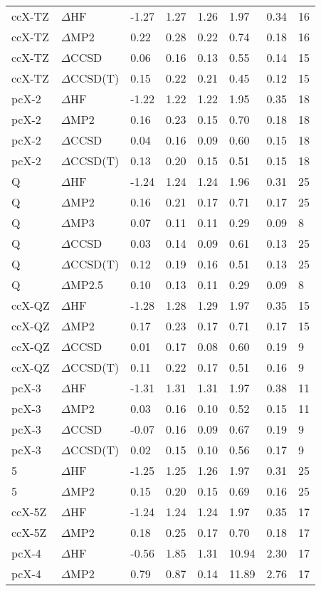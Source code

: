 \begin{table}
\begin{tabular}{l l l l l l l l }
    ccX-TZ & $\Delta$HF & -1.27 & 1.27 & 1.26 & 1.97 & 0.34 & 16 \\ 
    ccX-TZ & $\Delta$MP2 & 0.22 & 0.28 & 0.22 & 0.74 & 0.18 & 16 \\ 
    ccX-TZ & $\Delta$CCSD & 0.06 & 0.16 & 0.13 & 0.55 & 0.14 & 15 \\ 
    ccX-TZ & $\Delta$CCSD(T) & 0.15 & 0.22 & 0.21 & 0.45 & 0.12 & 15 \\ 
    pcX-2 & $\Delta$HF & -1.22 & 1.22 & 1.22 & 1.95 & 0.35 & 18 \\ 
    pcX-2 & $\Delta$MP2 & 0.16 & 0.23 & 0.15 & 0.70 & 0.18 & 18 \\ 
    pcX-2 & $\Delta$CCSD & 0.04 & 0.16 & 0.09 & 0.60 & 0.15 & 18 \\ 
    pcX-2 & $\Delta$CCSD(T) & 0.13 & 0.20 & 0.15 & 0.51 & 0.15 & 18 \\ 
    Q & $\Delta$HF & -1.24 & 1.24 & 1.24 & 1.96 & 0.31 & 25 \\ 
    Q & $\Delta$MP2 & 0.16 & 0.21 & 0.17 & 0.71 & 0.17 & 25 \\ 
    Q & $\Delta$MP3 & 0.07 & 0.11 & 0.11 & 0.29 & 0.09 & 8 \\ 
    Q & $\Delta$CCSD & 0.03 & 0.14 & 0.09 & 0.61 & 0.13 & 25 \\ 
    Q & $\Delta$CCSD(T) & 0.12 & 0.19 & 0.16 & 0.51 & 0.13 & 25 \\ 
    Q & $\Delta$MP2.5 & 0.10 & 0.13 & 0.11 & 0.29 & 0.09 & 8 \\ 
    ccX-QZ & $\Delta$HF & -1.28 & 1.28 & 1.29 & 1.97 & 0.35 & 15 \\ 
    ccX-QZ & $\Delta$MP2 & 0.17 & 0.23 & 0.17 & 0.71 & 0.17 & 15 \\ 
    ccX-QZ & $\Delta$CCSD & 0.01 & 0.17 & 0.08 & 0.60 & 0.19 & 9 \\ 
    ccX-QZ & $\Delta$CCSD(T) & 0.11 & 0.22 & 0.17 & 0.51 & 0.16 & 9 \\ 
    pcX-3 & $\Delta$HF & -1.31 & 1.31 & 1.31 & 1.97 & 0.38 & 11 \\ 
    pcX-3 & $\Delta$MP2 & 0.03 & 0.16 & 0.10 & 0.52 & 0.15 & 11 \\ 
    pcX-3 & $\Delta$CCSD & -0.07 & 0.16 & 0.09 & 0.67 & 0.19 & 9 \\ 
    pcX-3 & $\Delta$CCSD(T) & 0.02 & 0.15 & 0.10 & 0.56 & 0.17 & 9 \\ 
    5 & $\Delta$HF & -1.25 & 1.25 & 1.26 & 1.97 & 0.31 & 25 \\ 
    5 & $\Delta$MP2 & 0.15 & 0.20 & 0.15 & 0.69 & 0.16 & 25 \\ 
    ccX-5Z & $\Delta$HF & -1.24 & 1.24 & 1.24 & 1.97 & 0.35 & 17 \\ 
    ccX-5Z & $\Delta$MP2 & 0.18 & 0.25 & 0.17 & 0.70 & 0.18 & 17 \\ 
    pcX-4 & $\Delta$HF & -0.56 & 1.85 & 1.31 & 10.94 & 2.30 & 17 \\ 
    pcX-4 & $\Delta$MP2 & 0.79 & 0.87 & 0.14 & 11.89 & 2.76 & 17 \\ 
    \hline
  \end{tabular}
\end{table}
